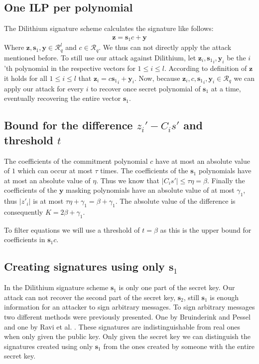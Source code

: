 \subsection{One ILP per polynomial}
The Dilithium signature scheme calculates the signature like follows:
\begin{align}
	\bm{z} = \bm{s}_{1} c + \bm{y}
\end{align}
Where $\bm{z}, \bm{s}_{1}, \bm{y} \in \mathcal{R}_q^{l}$ and $c \in \mathcal{R}_q$. We thus can not directly apply the attack mentioned before.
To still use our attack against Dilithium, let $\bm{z}_{i}, {\bm{s}_{1}}_{i}, \bm{y}_{i}$ be the $i$'th polynomial in the respective vectors for $1 \leq i \leq l$.
According to definition of $\bm{z}$ it holds for all $1 \leq i \leq l$ that $\bm{z}_{i} = c {\bm{s}_{1}}_{i} + \bm{y}_{i}$. Now, because $\bm{z}_{i}, c, {\bm{s}_{1}}_{i}, \bm{y}_{i} \in \mathcal{R}_q$ we can apply our attack for every $i$ to recover once secret polynomial of $\bm{s}_{1}$ at a time, eventually recovering the entire vector $\bm{s}_{1}$.

\subsection{Bound for the difference $z_{i}' - C_{i}s'$ and threshold $t$}
The coefficients of the commitment polynomial $c$ have at most an absolute value of $1$ which can occur at most $\tau$ times. The coefficients of the $\bm{s}_{1}$ polynomials have at most an absolute value of $\eta$. Thus we know that $\lvert  C_{i}s' \rvert \leq \tau \eta = \beta$. Finally the coefficients of the $\bm{y}$ masking polynomials have an absolute value of at most $\gamma_{1}$, thus $\lvert z'_{i} \rvert$ is at most $\tau \eta + \gamma_{1} = \beta + \gamma_{1}$. The absolute value of the difference is consequently $K = 2 \beta + \gamma_{1}$.

To filter equations we will use a threshold of $t = \beta$ as this is the upper bound for coefficients in $\bm{s}_{1}c$.%

\subsection{Creating signatures using only \texorpdfstring{$\bm{s}_{1}$}{\textbf{s}1}}
In the Dilithium signature scheme $\bm{s}_{1}$ is only one part of the secret key. Our attack can not recover the second part of the secret key, $\bm{s}_2$, still $\bm{s}_{1}$ is enough information for an attacker to sign arbitrary messages. To sign arbitrary messages two different methods were previously presented. One by Bruinderink and Pessel \cite[pp.~33--34]{Groot_Bruinderink_Pessl_2018} and one by Ravi et al. \cite[pp.~12--13]{ravi_2018}. These signatures are indistinguishable from real ones when only given the public key. Only given the secret key we can distinguish the signatures created using only $\bm{s}_{1}$ from the ones created by someone with the entire secret key. 


